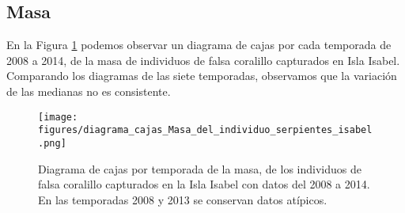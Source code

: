 \documentclass{article}
\begin{document}
\subsection*{Masa}
En la Figura \ref{fig:pngBoxsplotMasa} podemos observar un diagrama de cajas por cada temporada de 2008 a 2014, de la masa de individuos de falsa coralillo capturados en Isla Isabel.
Comparando los diagramas de las siete temporadas, observamos  que la variación de las medianas no es
consistente.

\begin{figure}[H]
\centering
\texttt{[image: figures/diagrama\_cajas\_Masa\_del\_individuo\_serpientes\_isabel.png]}
\caption{Diagrama de cajas por temporada de la masa, de los individuos de falsa coralillo capturados en la Isla Isabel con datos del 2008 a 2014. En las temporadas 2008 y 2013 se conservan datos atípicos.}
\label{fig:pngBoxsplotMasa}
\end{figure}
\end{document}
